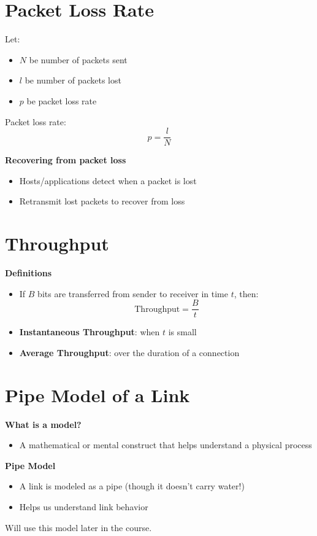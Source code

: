 \documentclass[9pt]{extarticle}
\begin{document}
\begin{multicols*}{3}
{\color{sectioncolor}\section*{\centering Packet Loss Rate}}
Let:
\begin{itemize}
    \item \( N \) be number of packets sent
    \item \( l \) be number of packets lost
    \item \( p \) be packet loss rate
\end{itemize}
Packet loss rate:
\[
p = \frac{l}{N}
\]

\textbf{Recovering from packet loss}
\begin{itemize}
    \item Hosts/applications detect when a packet is lost
    \item Retransmit lost packets to recover from loss
\end{itemize}

{\color{sectioncolor}\section*{\centering Throughput}}
\textbf{Definitions}
\begin{itemize}
    \item If \( B \) bits are transferred from sender to receiver in time \( t \), then:
    \[
    \text{Throughput} = \frac{B}{t}
    \]
    \item \textbf{Instantaneous Throughput}: when \( t \) is small
    \item \textbf{Average Throughput}: over the duration of a connection
\end{itemize}

{\color{sectioncolor}\section*{\centering Pipe Model of a Link}}
\textbf{What is a model?}
\begin{itemize}
    \item A mathematical or mental construct that helps understand a physical process
\end{itemize}
\textbf{Pipe Model}
\begin{itemize}
    \item A link is modeled as a pipe (though it doesn't carry water!)
    \item Helps us understand link behavior
\end{itemize}
Will use this model later in the course.


\end{multicols*}
\end{document}
